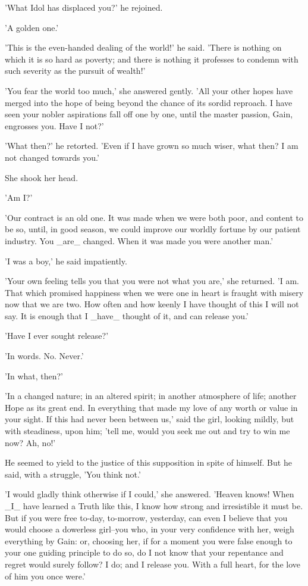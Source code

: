 'What Idol has displaced you?' he rejoined.

'A golden one.'

'This is the even-handed dealing of the world!' he said. 'There is
nothing on which it is so hard as poverty; and there is nothing it
professes to condemn with such severity as the pursuit of wealth!'

'You fear the world too much,' she answered gently. 'All your other
hopes have merged into the hope of being beyond the chance of its sordid
reproach. I have seen your nobler aspirations fall off one by one, until
the master passion, Gain, engrosses you. Have I not?'

'What then?' he retorted. 'Even if I have grown so much wiser, what
then? I am not changed towards you.'

She shook her head.

'Am I?'

'Our contract is an old one. It was made when we were both poor, and
content to be so, until, in good season, we could improve our worldly
fortune by our patient industry. You _are_ changed. When it was made you
were another man.'

'I was a boy,' he said impatiently.

'Your own feeling tells you that you were not what you are,' she
returned. 'I am. That which promised happiness when we were one in heart
is fraught with misery now that we are two. How often and how keenly I
have thought of this I will not say. It is enough that I _have_ thought
of it, and can release you.'

'Have I ever sought release?'

'In words. No. Never.'

'In what, then?'

'In a changed nature; in an altered spirit; in another atmosphere of
life; another Hope as its great end. In everything that made my love of
any worth or value in your sight. If this had never been between us,'
said the girl, looking mildly, but with steadiness, upon him; 'tell me,
would you seek me out and try to win me now? Ah, no!'

He seemed to yield to the justice of this supposition in spite of
himself. But he said, with a struggle, 'You think not.'

'I would gladly think otherwise if I could,' she answered. 'Heaven
knows! When _I_ have learned a Truth like this, I know how strong and
irresistible it must be. But if you were free to-day, to-morrow,
yesterday, can even I believe that you would choose a dowerless
girl--you who, in your very confidence with her, weigh everything by
Gain: or, choosing her, if for a moment you were false enough to your
one guiding principle to do so, do I not know that your repentance and
regret would surely follow? I do; and I release you. With a full heart,
for the love of him you once were.'

